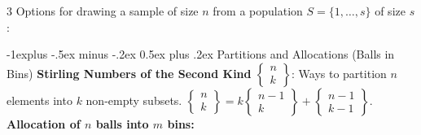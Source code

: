 \documentclass[10pt,landscape]{article}
\makeatletter
\renewcommand{\subsection}{\@startsection{subsection}{2}{0mm}%
                                {-1explus -.5ex minus -.2ex}%
                                {0.5ex plus .2ex}%
                                {\normalfont\normalsize\bfseries}}
\makeatother
\begin{document}
\begin{multicols*}{3}
Options for drawing a sample of size $n$ from a population $S = \{1,\dots,s\}$ of size $s$:
\begin{center}
    \setlength{\extrarowheight}{2pt} 
    
\end{center}

\subsection{Partitions and Allocations (Balls in Bins)}
\textbf{Stirling Numbers of the Second Kind} $\left\{\begin{matrix}n\\k\end{matrix}\right\}$: Ways to partition $n$ elements into $k$ non-empty subsets. $\left\{\begin{matrix}n\\k\end{matrix}\right\} = k\left\{\begin{matrix}n-1\\k\end{matrix}\right\} + \left\{\begin{matrix}n-1\\k-1\end{matrix}\right\}$.\\
\textbf{Allocation of $n$ balls into $m$ bins:}
\begin{center}
\end{center}


\end{multicols*}
\end{document}

